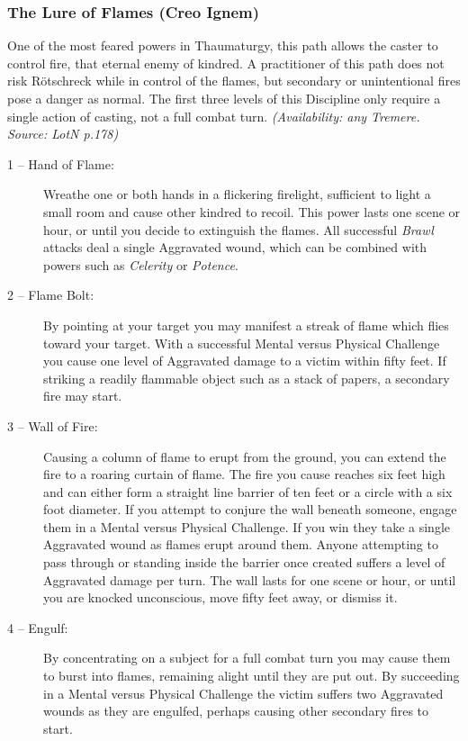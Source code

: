 \subsubsection{The Lure of Flames (Creo Ignem)}
One of the most feared powers in Thaumaturgy, this path allows the caster to control fire, that eternal 
enemy of kindred.  A practitioner of this path does not risk R\"{o}tschreck while in control of the flames, 
but secondary or unintentional fires pose a danger as normal.  The first three levels of this Discipline 
only require a single action of casting, not a full combat turn.  \emph{(Availability: any Tremere.  Source: 
LotN p.178)}

\begin{description}
	\item[1 -- Hand of Flame:]  Wreathe one or both hands in a flickering firelight, sufficient to light 
	a small room and cause other kindred to recoil.  This power lasts one scene or hour, or until you 
	decide to extinguish the flames.  All successful \emph{Brawl} attacks deal a single Aggravated wound, which 
	can be combined with powers such as \emph{Celerity} or \emph{Potence}.
	\item[2 -- Flame Bolt:]  By pointing at your target you may manifest a streak of flame which flies toward 
	your target.  With a successful Mental versus Physical Challenge you cause one level of Aggravated damage 
	to a victim within fifty feet.  If striking a readily flammable object such as a stack of papers, a 
	secondary fire may start.
	\item[3 -- Wall of Fire:]  Causing a column of flame to erupt from the ground, you can extend the fire to a 
	roaring curtain of flame.  The fire you cause reaches six feet high and can either form a straight line 
	barrier of ten feet or a circle with a six foot diameter.  If you attempt to conjure the wall beneath someone, 
	engage them in a Mental versus Physical Challenge.  If you win they take a single Aggravated wound as flames 
	erupt around them.  Anyone attempting to pass through or standing inside the barrier once created suffers a 
	level of Aggravated damage per turn.  The wall lasts for one scene or hour, or until you are knocked 
	unconscious, move fifty feet away, or dismiss it.
	\item[4 -- Engulf:]  By concentrating on a subject for a full combat turn you may cause them to burst into 
	flames, remaining alight until they are put out.  By succeeding in a Mental versus Physical Challenge the 
	victim suffers two Aggravated wounds as they are engulfed, perhaps causing other secondary fires to start.  

\end{description}

